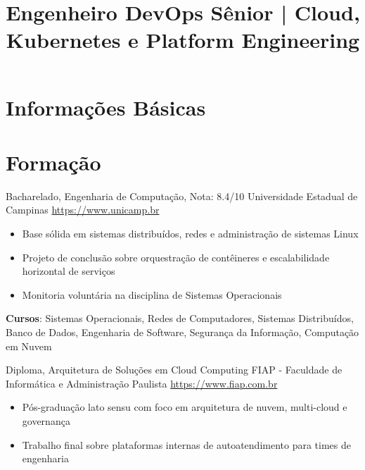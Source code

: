 \documentclass[a4paper, serif, 10pt]{moderncv}
\title{Engenheiro DevOps Sênior | Cloud, Kubernetes e Platform Engineering}
\begin{document}
\maketitle

\section{Informações Básicas}

\section{Formação}

        {Bacharelado, Engenharia de Computação, Nota: 8.4/10}
        {Universidade Estadual de Campinas}
        {\url{https://www.unicamp.br}}
        {}
        {\begin{itemize}
\item Base sólida em sistemas distribuídos, redes e administração de sistemas Linux
\item Projeto de conclusão sobre orquestração de contêineres e escalabilidade horizontal de serviços
\item Monitoria voluntária na disciplina de Sistemas Operacionais
\end{itemize}
\textbf{Cursos}: Sistemas Operacionais, Redes de Computadores, Sistemas Distribuídos, Banco de Dados, Engenharia de Software, Segurança da Informação, Computação em Nuvem}

        {Diploma, Arquitetura de Soluções em Cloud Computing}
        {FIAP - Faculdade de Informática e Administração Paulista}
        {\url{https://www.fiap.com.br}}
        {}
        {\begin{itemize}
\item Pós-graduação lato sensu com foco em arquitetura de nuvem, multi-cloud e governança
\item Trabalho final sobre plataformas internas de autoatendimento para times de engenharia
\end{itemize}}
\end{document}
